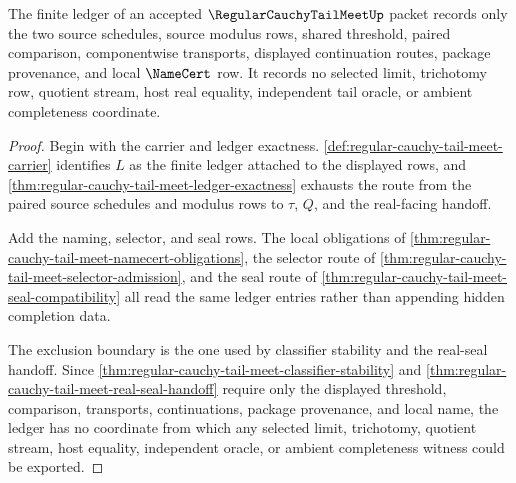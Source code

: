 \begin{theorem}
\label{thm:regular-cauchy-tail-meet-ledger-scope}
The finite ledger of an accepted $\RegularCauchyTailMeetUp$ packet records only the two source schedules, source modulus rows, shared threshold, paired comparison, componentwise transports, displayed continuation routes, package provenance, and local $\NameCert$ row. It records no selected limit, trichotomy row, quotient stream, host real equality, independent tail oracle, or ambient completeness coordinate.
\end{theorem}
\begin{proof}
Begin with the carrier and ledger exactness. \autoref{def:regular-cauchy-tail-meet-carrier} identifies $L$ as the finite ledger attached to the displayed rows, and \autoref{thm:regular-cauchy-tail-meet-ledger-exactness} exhausts the route from the paired source schedules and modulus rows to $\tau$, $Q$, and the real-facing handoff.

Add the naming, selector, and seal rows. The local obligations of \autoref{thm:regular-cauchy-tail-meet-namecert-obligations}, the selector route of \autoref{thm:regular-cauchy-tail-meet-selector-admission}, and the seal route of \autoref{thm:regular-cauchy-tail-meet-seal-compatibility} all read the same ledger entries rather than appending hidden completion data.

The exclusion boundary is the one used by classifier stability and the real-seal handoff. Since \autoref{thm:regular-cauchy-tail-meet-classifier-stability} and \autoref{thm:regular-cauchy-tail-meet-real-seal-handoff} require only the displayed threshold, comparison, transports, continuations, package provenance, and local name, the ledger has no coordinate from which any selected limit, trichotomy, quotient stream, host equality, independent oracle, or ambient completeness witness could be exported.
\end{proof}

